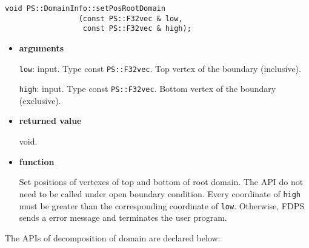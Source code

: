 
\begin{screen}
\begin{verbatim}
void PS::DomainInfo::setPosRootDomain
                 (const PS::F32vec & low,
                  const PS::F32vec & high);
\end{verbatim}
\end{screen}

\begin{itemize}

\item {\bf arguments}

\texttt{low}: input. Type const {\tt PS::F32vec}. Top vertex of the boundary (inclusive).

\texttt{high}: input. Type const {\tt PS::F32vec}. Bottom vertex of the boundary (exclusive).



\item {\bf returned value}

void.

\item {\bf function}

Set positions of vertexes of top and bottom of root domain. The API do
not need to be called under open boundary condition. Every coordinate
of \texttt{high} must be greater than the corresponding coordinate
of \texttt{low}. Otherwise, FDPS sends a error message and terminates
the user program.


\end{itemize}



The APIs of decomposition of domain are declared below:

